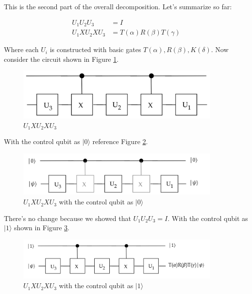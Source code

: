 \documentclass[main.tex]{subfiles}
\begin{document}
    This is the second part of the overall decomposition. Let's summarize so far:
    
    $$
    \begin{aligned}
    U_{1} U_{2} U_{3} &=I \\
    U_{1} X U_{2} X U_{3} &=T(\alpha) R(\beta) T(\gamma)
    \end{aligned}
    $$
    
    Where each $U_{i}$ is constructed with basic gates $T(\alpha), R(\beta), K(\delta)$. Now consider the circuit shown in Figure \ref{fig:07universal7}.
    
    \begin{figure}
        \centering
        \includegraphics[width=4in]{notes/figs/n09/07universal7.png}
        \caption{$U_{1} X U_{2} X U_{3}$}
        \label{fig:07universal7}
    \end{figure}
    
    With the control qubit as $|0\rangle$ reference Figure \ref{fig:08universal8}.
    
    \begin{figure}
        \centering
        \includegraphics[width=4in]{notes/figs/n09/08universal8.png}
        \caption{$U_{1} X U_{2} X U_{3}$ with the control qubit as $|0\rangle$}
        \label{fig:08universal8}
    \end{figure}
    
    There's no change because we showed that $U_{1} U_{2} U_{3}=I$. With the control qubit as $|1\rangle$ shown in Figure \ref{fig:09universal9}.
    
    \begin{figure}
        \centering
        \includegraphics[width=4in]{notes/figs/n09/09universal9.png}
        \caption{$U_{1} X U_{2} X U_{3}$ with the control qubit as $|1\rangle$}
        \label{fig:09universal9}
    \end{figure}
    
\end{document}
